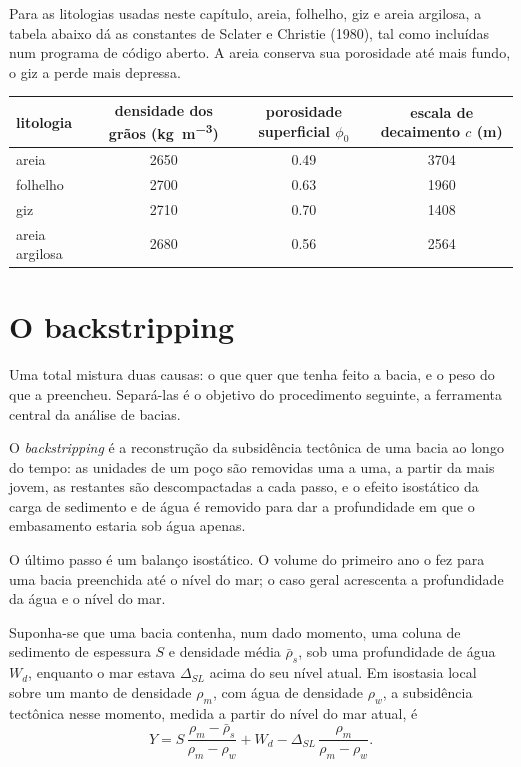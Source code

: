 Para as litologias usadas neste capítulo, areia, folhelho, giz e areia argilosa, a tabela abaixo
dá as constantes de Sclater e Christie (1980), tal como incluídas num programa de código aberto.
A areia conserva sua porosidade até mais fundo, o giz a perde mais depressa.

\begin{center}
\small
\begin{tabular}{lccc}
\hline
litologia & densidade dos grãos (\unit{kg.m^{-3}}) & porosidade superficial $\phi_0$ & escala de decaimento $c$ (\unit{m}) \\
\hline
areia & 2650 & 0.49 & 3704 \\
folhelho & 2700 & 0.63 & 1960 \\
giz & 2710 & 0.70 & 1408 \\
areia argilosa & 2680 & 0.56 & 2564 \\
\hline
\end{tabular}
\end{center}

\section{O backstripping}\label{sec:b2:basins-compared:backstripping}

Uma  total mistura duas causas: o que quer que tenha feito a bacia, e o peso do que
a preencheu. Separá-las é o objetivo do procedimento seguinte, a ferramenta central da análise
de bacias.

\begin{definition}[Backstripping]\label{def:b2:basins-compared:backstripping}
O \emph{backstripping} é a reconstrução da subsidência tectônica de uma
bacia ao longo do tempo: as unidades de um poço são removidas uma a uma, a partir da mais jovem, as
restantes são descompactadas a cada passo, e o efeito isostático da carga de sedimento e de água
é removido para dar a profundidade em que o embasamento estaria sob água apenas.
\end{definition}

O último passo é um balanço isostático. O volume do primeiro ano o fez para uma bacia preenchida até o nível do mar;
o caso geral acrescenta a profundidade da água e o nível do mar.

\begin{proposition}\label{prop:b2:basins-compared:backstrip}
Suponha-se que uma bacia contenha, num dado momento, uma coluna de sedimento de espessura $S$ e densidade média
$\bar\rho_s$, sob uma profundidade de água $W_d$, enquanto o mar estava $\Delta_{SL}$ acima do seu nível
atual. Em isostasia local sobre um manto de densidade $\rho_m$, com água de densidade $\rho_w$, a
subsidência tectônica nesse momento, medida a partir do nível do mar atual, é
\[
  Y = S\,\frac{\rho_m - \bar\rho_s}{\rho_m - \rho_w} + W_d
      - \Delta_{SL}\,\frac{\rho_m}{\rho_m - \rho_w}.
\]
\end{proposition}

